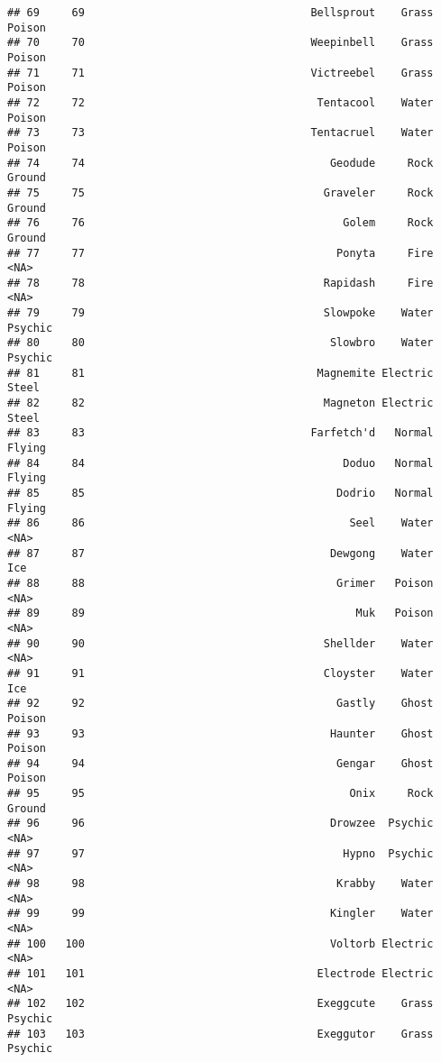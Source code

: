 \documentclass[
]{article}
\begin{document}
\begin{verbatim}
## 69     69                                   Bellsprout    Grass   Poison
## 70     70                                   Weepinbell    Grass   Poison
## 71     71                                   Victreebel    Grass   Poison
## 72     72                                    Tentacool    Water   Poison
## 73     73                                   Tentacruel    Water   Poison
## 74     74                                      Geodude     Rock   Ground
## 75     75                                     Graveler     Rock   Ground
## 76     76                                        Golem     Rock   Ground
## 77     77                                       Ponyta     Fire     <NA>
## 78     78                                     Rapidash     Fire     <NA>
## 79     79                                     Slowpoke    Water  Psychic
## 80     80                                      Slowbro    Water  Psychic
## 81     81                                    Magnemite Electric    Steel
## 82     82                                     Magneton Electric    Steel
## 83     83                                   Farfetch'd   Normal   Flying
## 84     84                                        Doduo   Normal   Flying
## 85     85                                       Dodrio   Normal   Flying
## 86     86                                         Seel    Water     <NA>
## 87     87                                      Dewgong    Water      Ice
## 88     88                                       Grimer   Poison     <NA>
## 89     89                                          Muk   Poison     <NA>
## 90     90                                     Shellder    Water     <NA>
## 91     91                                     Cloyster    Water      Ice
## 92     92                                       Gastly    Ghost   Poison
## 93     93                                      Haunter    Ghost   Poison
## 94     94                                       Gengar    Ghost   Poison
## 95     95                                         Onix     Rock   Ground
## 96     96                                      Drowzee  Psychic     <NA>
## 97     97                                        Hypno  Psychic     <NA>
## 98     98                                       Krabby    Water     <NA>
## 99     99                                      Kingler    Water     <NA>
## 100   100                                      Voltorb Electric     <NA>
## 101   101                                    Electrode Electric     <NA>
## 102   102                                    Exeggcute    Grass  Psychic
## 103   103                                    Exeggutor    Grass  Psychic

\end{verbatim}
\end{document}
